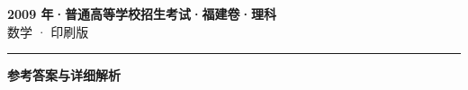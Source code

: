 \documentclass[zihao=5, a4paper]{ctexart}
\begin{document}
\begin{center}
  {\Large\bfseries 2009 年·普通高等学校招生考试·福建卷·理科}\\[4pt]
  {\large 数学 · 印刷版}
\end{center}
\medskip
{}

\par\bigskip\hrule\bigskip
{}
\begin{center}{\large\bfseries 参考答案与详细解析}\end{center}
\smallskip

\end{document}
